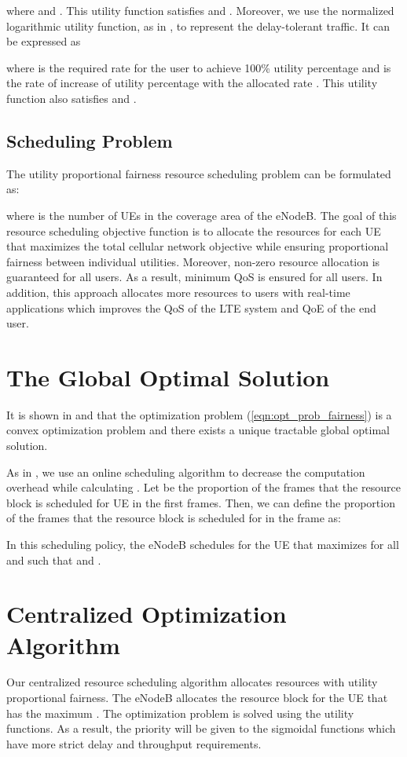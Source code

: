 \documentclass[journal]{IEEEtran} 				\IEEEoverridecommandlockouts 	\usepackage{amsmath,amssymb}
\begin{document}
where  and . This utility function satisfies  and . Moreover, we use the normalized logarithmic utility function, as in \cite{UtilityFairness}, to represent the delay-tolerant traffic. It can be expressed as 

where  is the required rate for the user to achieve 100\% utility percentage and  is the rate of increase of utility percentage with the allocated rate . This utility function also satisfies  and . 
 


\subsection{Scheduling Problem}\label{sec:scheduling}
The utility proportional fairness resource scheduling problem can be formulated as:

where  is the number of UEs in the coverage area of the eNodeB. The goal of this resource scheduling objective function is to allocate the resources for each UE that maximizes the total cellular network objective while ensuring proportional fairness between individual utilities. Moreover, non-zero resource allocation is guaranteed for all users. As a result, minimum QoS is ensured for all users. In addition, this approach allocates more resources to users with real-time applications which improves the QoS of the LTE system and QoE of the end user. 

\section{The Global Optimal Solution}\label{sec:Proof}

It is shown in \cite{Ahmed_Utility2} and \cite{Ahmed_Utility3} that the optimization problem (\ref{eqn:opt_prob_fairness}) is a convex optimization problem and there exists a unique tractable global optimal solution. 

As in \cite{SelfOrganizedLTE}, we use an online scheduling algorithm to decrease the computation overhead while calculating . Let  be the proportion of the frames that the resource block  is scheduled for UE  in the first  frames. Then, we can define the proportion of the frames that the resource block  is scheduled for  in the  frame as:


In this scheduling policy, the eNodeB schedules for the UE that maximizes  for all  and  such that  and  \cite{Erpek}.
  


\section{Centralized Optimization Algorithm}\label{sec:Algorithm}
Our centralized resource scheduling algorithm allocates resources with utility proportional fairness. The eNodeB allocates the resource block  for the UE that has the maximum . The optimization problem is solved using the utility functions. As a result, the priority will be given to the sigmoidal functions which have more strict delay and throughput requirements. 
\end{document}
